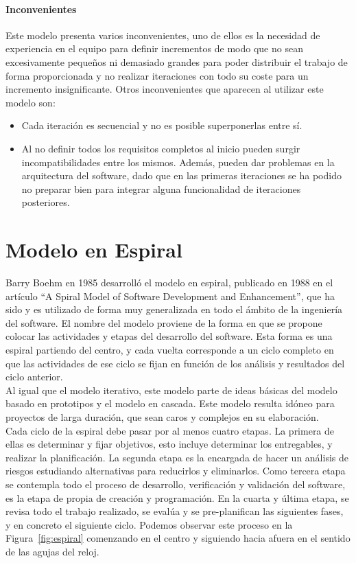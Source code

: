 \paragraph{Inconvenientes}
Este modelo presenta varios inconvenientes, uno de ellos es la
necesidad de experiencia en el equipo para definir incrementos de modo
que no sean excesivamente pequeños ni demasiado grandes para poder
distribuir el trabajo de forma proporcionada y no realizar iteraciones
con todo su coste para un incremento insignificante. Otros
inconvenientes que aparecen al utilizar este modelo son:
\begin{itemize}
\item Cada iteración es secuencial y no es posible superponerlas entre
  sí.
\item Al no definir todos los requisitos completos al inicio pueden
  surgir incompatibilidades entre los mismos. Además, pueden dar
  problemas en la arquitectura del software, dado que en las primeras
  iteraciones se ha podido no preparar bien para integrar alguna
  funcionalidad de iteraciones posteriores.
\end{itemize}


\section{Modelo en Espiral}
\label{sec:espiral}

Barry Boehm en 1985 desarrolló el modelo en espiral, publicado en 1988
en el artículo ``A Spiral Model of Software Development and
Enhancement'', que ha sido y es utilizado de forma muy
generalizada en todo el ámbito de la ingeniería del software. El
nombre del modelo proviene de la forma en que se propone colocar las
actividades y etapas del desarrollo del software. Esta forma es una
espiral partiendo del centro, y cada vuelta corresponde a un ciclo
completo en que las actividades de ese ciclo se fijan en función de
los análisis y resultados del ciclo anterior.\\

 
Al igual que el modelo iterativo, este modelo parte de ideas básicas
del modelo basado en prototipos y el modelo en cascada. Este modelo
resulta idóneo para proyectos de larga duración, que sean caros y
complejos en su elaboración.\\

Cada ciclo de la espiral debe pasar por al menos cuatro etapas. La
primera de ellas es determinar y fijar objetivos, esto incluye
determinar los entregables, y realizar la planificación. La segunda
etapa es la encargada de hacer un análisis de riesgos estudiando
alternativas para reducirlos y eliminarlos. Como tercera etapa se
contempla todo el proceso de desarrollo, verificación y validación del
software, es la etapa de propia de creación y programación. En la
cuarta y última etapa, se revisa todo el trabajo realizado, se evalúa
y se pre-planifican las siguientes fases, y en concreto el siguiente
ciclo. Podemos observar este proceso en la Figura~\ref{fig:espiral}
comenzando en el centro y siguiendo hacia afuera en el sentido de las
agujas del reloj.

